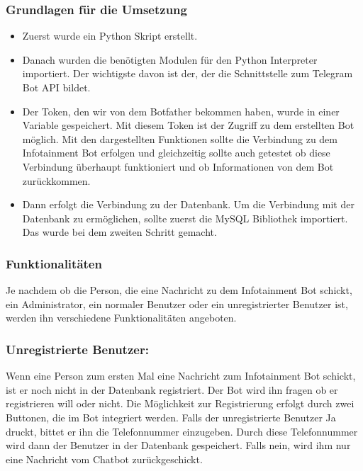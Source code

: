 \subsubsection{Grundlagen für die Umsetzung}
\begin{itemize}
	\item Zuerst wurde ein Python Skript erstellt.
\end{itemize}
\begin{itemize}
	\item Danach wurden die benötigten Modulen für den Python Interpreter importiert.  Der wichtigste davon ist der, der die Schnittstelle zum Telegram Bot API bildet.
\end{itemize}
\begin{itemize}
	\item Der Token, den wir von dem Botfather bekommen haben, wurde in einer Variable gespeichert. Mit diesem Token ist der Zugriff zu dem erstellten Bot möglich. Mit den dargestellten Funktionen sollte die Verbindung zu dem Infotainment Bot erfolgen und gleichzeitig sollte auch getestet ob diese Verbindung überhaupt funktioniert und ob Informationen von dem Bot zurückkommen. 

\end{itemize}
\begin{itemize}
	\item Dann erfolgt die Verbindung zu der Datenbank. Um die Verbindung mit der Datenbank zu ermöglichen, sollte zuerst die MySQL Bibliothek importiert. Das wurde bei dem zweiten Schritt gemacht. 
\end{itemize}
\subsubsection{Funktionalitäten}
Je nachdem ob die Person, die eine Nachricht zu dem Infotainment Bot schickt, ein Administrator, ein normaler Benutzer oder ein unregistrierter Benutzer ist, werden ihn verschiedene Funktionalitäten angeboten. 
\subsubsection{Unregistrierte Benutzer:}
Wenn eine Person zum ersten Mal eine Nachricht zum Infotainment Bot schickt, ist er noch nicht in der Datenbank registriert. Der Bot wird ihn fragen ob er registrieren will oder nicht. Die Möglichkeit zur Registrierung erfolgt durch zwei Buttonen, die im Bot integriert werden. Falls der unregistrierte Benutzer Ja druckt, bittet er ihn die Telefonnummer einzugeben. Durch diese Telefonnummer wird dann der Benutzer in der Datenbank gespeichert. Falls nein, wird ihm nur eine Nachricht vom Chatbot zurückgeschickt. 

